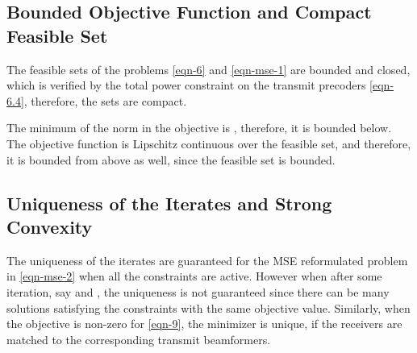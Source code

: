 \subsection{Bounded Objective Function and Compact Feasible Set}
The feasible sets of the problems \eqref{eqn-6} and \eqref{eqn-mse-1} are bounded and closed, which is verified by the total power constraint on the transmit precoders \eqref{eqn-6.4}, therefore, the sets are compact. 

The minimum of the norm in the objective is , therefore, it is bounded below. The objective function is Lipschitz continuous over the feasible set, and therefore, it is bounded from above as well, since the feasible set is bounded. %

\subsection{Uniqueness of the Iterates and Strong Convexity} \label{c-a}
The uniqueness of the iterates  are guaranteed for the \ac{MSE} reformulated problem in \eqref{eqn-mse-2} when all the constraints are active. However when  after some iteration, say  and , the uniqueness is not guaranteed since there can be many solutions satisfying the constraints with the same objective value. Similarly, when the objective is non-zero for  \eqref{eqn-9}, the minimizer is unique, if the receivers are matched to the corresponding transmit beamformers. %

